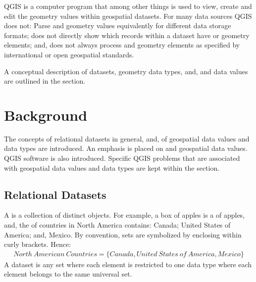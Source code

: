 \documentclass[a4paper,11pt,english]{sphinxmanual}
\begin{document}
QGIS  is a computer program that among other things is used to view, create and edit the geometry values within geospatial datasets.  For many data sources QGIS does not: Parse  and  geometry values equivalently for different data storage formats; does not directly show which records within a dataset have  or  geometry elements; and, does not always process  and  geometry elements as specified by international or open geospatial standards.

A conceptual description of datasets, geometry data types, and,  and  data values are outlined in the {\hyperref[\detokenize{background:concept-page}]{}} section.


\chapter{Background}
\label{\detokenize{background:background}}\label{\detokenize{background:concept-page}}\label{\detokenize{background::doc}}
The concepts of relational datasets in general, and, of geospatial data values and data types are introduced.  An emphasis is placed on  and  geospatial data values.  QGIS software is also introduced.  Specific QGIS problems that are associated with geospatial data values and data types are kept within the {\hyperref[\detokenize{QGISproblems:qgis-data-provider-data-parsing-problems}]{}} section.


\section{Relational Datasets}
\label{\detokenize{background:relational-datasets}}
A  is a collection of distinct objects.  For example, a box of apples is a  of apples, and, the  of countries in North America contains: Canada;  United States of America; and, Mexico.  By convention, sets are symbolized by enclosing within curly brackets.  Hence:
\begin{equation*}
\begin{split}North\ American\ Countries = \{Canada, United\ States\ of\ America, Mexico\}\end{split}
\end{equation*}
A dataset is any set where each element is restricted to one data type  where each element belongs to the same universal set.
\end{document}
